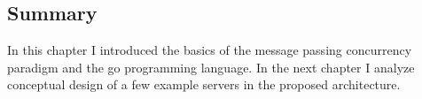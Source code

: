 

\subsection{Summary}
In this chapter I introduced the basics of the message passing concurrency
paradigm and the go programming language. In the next chapter I 
analyze conceptual design of a few example servers in the proposed
architecture.



